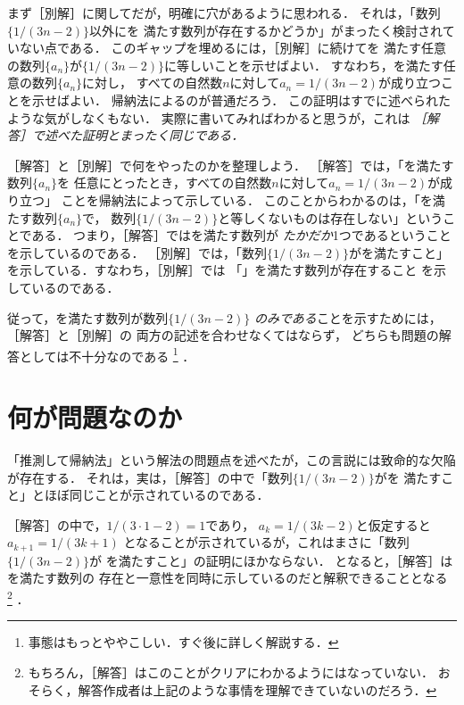 \documentclass[11pt,a4paper]{ltjsarticle} %
\theoremstyle{mystyle} %
\begin{document}
まず［別解］に関してだが，明確に穴があるように思われる．
それは，「数列$\{ 1/(3n-2) \}$以外にを
満たす数列が存在するかどうか」がまったく検討されていない点である．
このギャップを埋めるには，［別解］に続けてを
満たす任意の数列$\{ a_n \}$が$\{ 1/(3n-2) \}$に等しいことを示せばよい．
すなわち，を満たす任意の数列$\{a_n \}$に対し，
すべての自然数$n$に対して$a_n = 1/(3n-2)$が成り立つことを示せばよい．
帰納法によるのが普通だろう．
この証明はすでに述べられたような気がしなくもない．
実際に書いてみればわかると思うが，これは
\emph{［解答］で述べた証明とまったく同じである．}


［解答］と［別解］で何をやったのかを整理しよう．
［解答］では，「を満たす数列$\{ a_n \}$を
任意にとったとき，すべての自然数$n$に対して$a_n = 1/(3n-2)$が成り立つ」
ことを帰納法によって示している．
このことからわかるのは，「を満たす数列$\{ a_n \}$で，
数列$\{ 1/(3n-2) \}$と等しくないものは存在しない」ということである．
つまり，［解答］ではを満たす数列が
\emph{たかだか}1つであるということを示しているのである．
［別解］では，「数列$\{ 1/(3n-2) \}$がを満たすこと」
を示している．すなわち，［別解］では
「」を満たす数列が存在すること
を示しているのである．

従って，を満たす数列が数列$\{ 1/(3n-2) \}$
\emph{のみである}ことを示すためには，［解答］と［別解］の
両方の記述を合わせなくてはならず，
どちらも問題の解答としては不十分なのである
\footnote{
	事態はもっとややこしい．すぐ後に詳しく解説する．
}
．


\section{何が問題なのか}
「推測して帰納法」という解法の問題点を述べたが，この言説には致命的な欠陥が存在する．
それは，実は，［解答］の中で「数列$\{ 1/(3n-2) \}$がを
満たすこと」とほぼ同じことが示されているのである．

［解答］の中で，$1/(3 \cdot 1 -2) =1$であり，
$a_k = 1/(3k-2)$と仮定すると$a_{k+1} = 1/(3k+1)$
となることが示されているが，これはまさに「数列$\{ 1/(3n-2) \}$が
を満たすこと」の証明にほかならない．
となると，［解答］はを満たす数列の
存在と一意性を同時に示しているのだと解釈できることとなる
\footnote{
	もちろん，［解答］はこのことがクリアにわかるようにはなっていない．
	おそらく，解答作成者は上記のような事情を理解できていないのだろう．
}
．
\end{document}
